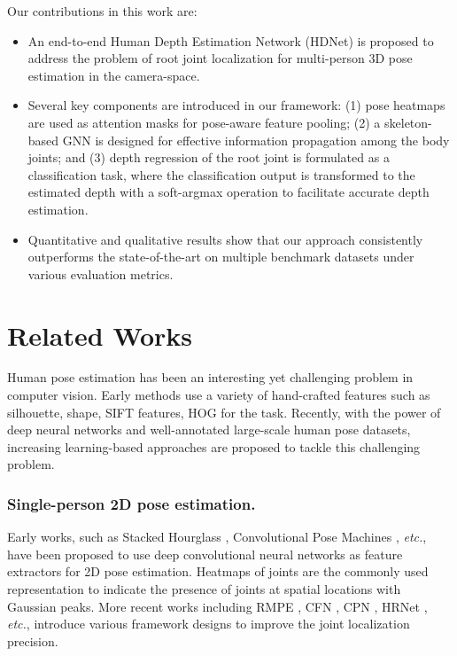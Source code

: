 \documentclass[runningheads]{llncs}
\begin{document}
Our contributions in this work are:
\begin{itemize}
    \item An end-to-end Human Depth Estimation Network (HDNet) is proposed to address the problem of root joint localization for multi-person 3D pose estimation in the camera-space.
    \item Several key components are introduced in our framework: (1) pose heatmaps are used as attention masks for pose-aware feature pooling; (2) a skeleton-based GNN is designed for effective information propagation among the body joints; and (3) 
    depth regression of the root joint is formulated as a classification task, where the classification output is transformed to the estimated depth with a soft-argmax operation to facilitate accurate depth estimation.
    \item Quantitative and qualitative results show that our approach consistently outperforms the state-of-the-art on multiple benchmark datasets under various evaluation metrics.
\end{itemize}



\section{Related Works}

Human pose estimation has been an interesting yet challenging problem in computer vision. Early methods use a variety of hand-crafted features such as silhouette, shape, SIFT features, HOG for the task. Recently, with the power of deep neural networks and well-annotated large-scale human pose datasets, increasing learning-based approaches are proposed to tackle this challenging problem.

\subsubsection{Single-person 2D pose estimation.}
Early works, such as Stacked Hourglass \cite{newell2016stacked}, Convolutional Pose Machines \cite{wei2016convolutional}, \textit{etc.}, have been proposed to use deep convolutional neural networks as feature extractors for 2D pose estimation. Heatmaps of joints are the commonly used representation to indicate the presence of joints at spatial locations with Gaussian peaks. More recent works including RMPE \cite{fang2017rmpe}, CFN \cite{huang2017coarse}, CPN \cite{chen2018cascaded}, HRNet \cite{sun2019deep}, \textit{etc.}, introduce various framework designs to improve the joint localization precision.
\end{document}
